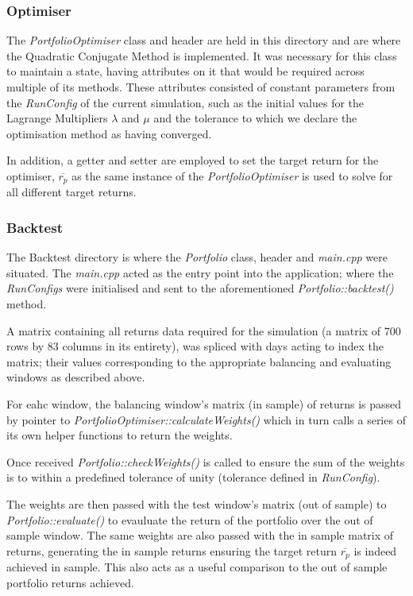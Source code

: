 \documentclass{article}
\begin{document}
\subsubsection{Optimiser}
\label{sec:portfolio_optimiser}

The \textit{PortfolioOptimiser} class and header are held in this directory and are where the Quadratic Conjugate Method is implemented. It was necessary for this class to maintain a state, having attributes on it that would be required across multiple of its methods. These attributes consisted of constant parameters from the \textit{RunConfig} of the current simulation, such as the initial values for the Lagrange Multipliers $\lambda$ and $\mu$ and the tolerance to which we declare the optimisation method as having converged. 

In addition, a getter and setter are employed to set the target return for the optimiser, $\overline{r_p}$ as the same instance of the \textit{PortfolioOptimiser} is used to solve for all different target returns.




\subsubsection{Backtest}
\label{sec:backtestcode}

The Backtest directory is where the \textit{Portfolio} class, header and \textit{main.cpp} were situated. The \textit{main.cpp} acted as the entry point into the application; where the \textit{RunConfigs} were initialised and sent to the aforementioned \textit{Portfolio::backtest()} method.

A matrix containing all returns data required for the simulation (a matrix of 700 rows by 83 columns in its entirety), was spliced with days acting to index the matrix; their values corresponding to the appropriate balancing and evaluating windows as described above.

For eahc window, the balancing window's matrix (in sample) of returns is passed by pointer to \textit{PortfolioOptimiser::calculateWeights()} which in turn calls a series of its own helper functions to return the weights. 

Once received \textit{Portfolio::checkWeights()} is called to ensure the sum of the weights is to within a predefined tolerance of unity (tolerance defined in \textit{RunConfig}). 

The weights are then passed with the test window's matrix (out of sample) to \textit{Portfolio::evaluate()} to evauluate the return of the portfolio over the out of sample window. The same weights are also passed with the in sample matrix of returns, generating the in sample returns ensuring the target return $\overline{r_p}$ is indeed achieved in sample. This also acts as a useful comparison to the out of sample portfolio returns achieved.
\end{document}
